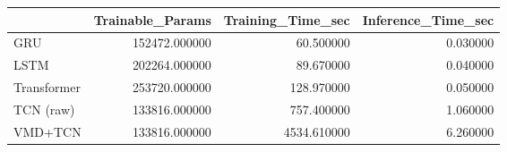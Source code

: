 \begin{tabular}{lrrr}
\toprule
 & Trainable_Params & Training_Time_sec & Inference_Time_sec \\
\midrule
GRU & 152472.000000 & 60.500000 & 0.030000 \\
LSTM & 202264.000000 & 89.670000 & 0.040000 \\
Transformer & 253720.000000 & 128.970000 & 0.050000 \\
TCN (raw) & 133816.000000 & 757.400000 & 1.060000 \\
VMD+TCN & 133816.000000 & 4534.610000 & 6.260000 \\
\bottomrule
\end{tabular}
